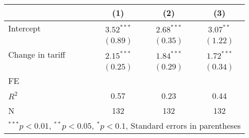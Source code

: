 
\begin{tabular}{l c c c }
\hline
 & (1) & (2) & (3) \\
\hline
Intercept & $3.52^{***}$ & $2.68^{***}$ & $3.07^{**}$  \\
            & $(0.89)$     & $(0.35)$     & $(1.22)$     \\
Change in tariff     & $2.15^{***}$ & $1.84^{***}$ & $1.72^{***}$ \\
            & $(0.25)$     & $(0.29)$     & $(0.34)$     \\
\hline
FE          &                &                &                \\ 
\hline
$R^2$       & 0.57         & 0.23         & 0.44         \\
N           & 132          & 132          & 132          \\
\hline
\multicolumn{4}{l}{\scriptsize{$^{***}p<0.01$, $^{**}p<0.05$, $^*p<0.1$, Standard errors in parentheses}}
\end{tabular}
